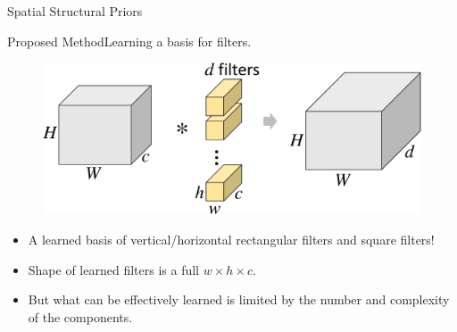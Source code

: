 \documentclass[t,xcolor=dvipsnames]{beamer}
\begin{document}
\begin{frame}
\vfill
\centering
Spatial Structural Priors\par%
\vfill
\end{frame}

\usebackgroundtemplate{}

\begin{frame}{Proposed Method}{Learning a basis for filters.}
\begin{figure}
   \includegraphics[width=\textwidth, page=4]{../Figs/PDF/sparsification}
\end{figure}
\begin{itemize}
    \item A learned basis of vertical/horizontal rectangular filters and square filters!
    \item Shape of learned filters is a full $w \times h \times c$.
    \item But what can be effectively learned is limited by the number and complexity of the components.
\end{itemize}
\end{frame}

\end{document}
